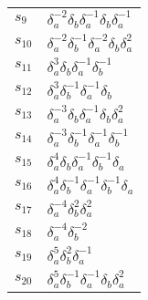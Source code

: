 \documentclass{article}
\begin{document}
\begin{center}
\begin{tabular}{ll}
$s_{9}$ & $\delta_a^{-2}\delta_b^{}\delta_a^{-1}\delta_b^{}\delta_a^{-1}$ \\
$s_{10}$ & $\delta_a^{-2}\delta_b^{-1}\delta_a^{-2}\delta_b^{}\delta_a^{2}$ \\
$s_{11}$ & $\delta_a^{3}\delta_b^{}\delta_a^{-1}\delta_b^{-1}$ \\
$s_{12}$ & $\delta_a^{3}\delta_b^{-1}\delta_a^{-1}\delta_b^{}$ \\
$s_{13}$ & $\delta_a^{-3}\delta_b^{}\delta_a^{-1}\delta_b^{}\delta_a^{2}$ \\
$s_{14}$ & $\delta_a^{-3}\delta_b^{-1}\delta_a^{-1}\delta_b^{-1}$ \\
$s_{15}$ & $\delta_a^{4}\delta_b^{}\delta_a^{-1}\delta_b^{-1}\delta_a^{}$ \\
$s_{16}$ & $\delta_a^{4}\delta_b^{-1}\delta_a^{-1}\delta_b^{-1}\delta_a^{}$ \\
$s_{17}$ & $\delta_a^{-4}\delta_b^{2}\delta_a^{2}$ \\
$s_{18}$ & $\delta_a^{-4}\delta_b^{-2}$ \\
$s_{19}$ & $\delta_a^{5}\delta_b^{2}\delta_a^{-1}$ \\
$s_{20}$ & $\delta_a^{5}\delta_b^{-1}\delta_a^{-1}\delta_b^{}\delta_a^{2}$ \\
\bottomrule
\end{tabular}
\end{center}

\thispagestyle{empty}
\end{document}
